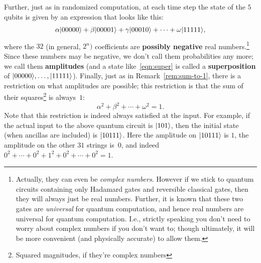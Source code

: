 \documentclass[12pt]{article}
\begin{document}
Further, just as in randomized computation, at each time step the state of the $5$ qubits is given by an expression that looks like this:
\begin{equation}            \label{eqn:super}
    \alpha \ket{00000} + \beta \ket{00001} + \gamma \ket{00010} + \cdots + \omega \ket{11111},
\end{equation}
where the $32$ (in general, $2^n)$ coefficients are \textbf{possibly negative} real numbers.\footnote{Actually, they can even be \emph{complex numbers}.  However if we stick to quantum circuits containing only Hadamard gates and reversible classical gates, then they will always just be real numbers.  Further, it is known that these two gates are \emph{universal} for quantum computation, and hence real numbers are universal for quantum computation.  I.e., strictly speaking you don't need to worry about complex numbers if you don't want to; though ultimately, it will be more convenient (and physically accurate) to allow them.} Since these numbers may be negative, we don't call them probabilities any more; we call them \textbf{amplitudes} (and a state like~\eqref{eqn:super} is called a \textbf{superposition} of $\ket{00000}, \dots, \ket{11111}$).  Finally, just as in Remark~\ref{rem:sum-to-1}, there is a restriction on what amplitudes are possible; this restriction is that the sum of their squares\footnote{Squared magnitudes, if they're complex numbers} is always~$1$:
\[
    \alpha^2 + \beta^2 + \cdots + \omega^2 = 1.
\]
Note that this restriction is indeed always satisfied at the input.  For example, if the actual input to the above quantum circuit is $\ket{101}$, then the initial state (when ancillas are included) is $\ket{10111}$. Here the amplitude on $\ket{10111}$ is $1$, the amplitude on the other $31$ strings is~$0$, and indeed $0^2  + \cdots + 0^2 + 1^2 + 0^2 + \cdots + 0^2 = 1$.\\
\end{document}

